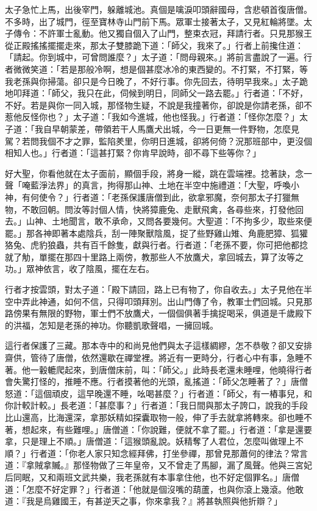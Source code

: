 太子急忙上馬，出後宰門，躲離城池。真個是噙淚叩頭辭國母，含悲頓首復唐僧。不多時，出了城門，徑至寶林寺山門前下馬。眾軍士接著太子，又見紅輪將墜。太子傳令：不許軍士亂動。他又獨自個入了山門，整束衣冠，拜請行者。只見那猴王從正殿搖搖擺擺走來，那太子雙膝跪下道：「師父，我來了。」行者上前攙住道：「請起。你到城中，可曾問誰麼？」太子道：「問母親來。」將前言盡說了一遍。行者微微笑道：「若是那般冷啊，想是個甚麼冰冷的東西變的。不打緊，不打緊，等我老孫與你掃蕩。卻只是今日晚了，不好行事。你先回去，待明早我來。」太子跪地叩拜道：「師父，我只在此，伺候到明日，同師父一路去罷。」行者道：「不好，不好。若是與你一同入城，那怪物生疑，不說是我撞著你，卻說是你請老孫，卻不惹他反怪你也？」太子道：「我如今進城，他也怪我。」行者道：「怪你怎麼？」太子道：「我自早朝蒙差，帶領若干人馬鷹犬出城，今一日更無一件野物，怎麼見駕？若問我個不才之罪，監陷羑里，你明日進城，卻將何倚？況那班部中，更沒個相知人也。」行者道：「這甚打緊？你肯早說時，卻不尋下些等你？」

好大聖，你看他就在太子面前，顯個手段，將身一縱，跳在雲端裡。捻著訣，念一聲「唵藍淨法界」的真言，拘得那山神、土地在半空中施禮道：「大聖，呼喚小神，有何使令？」行者道：「老孫保護唐僧到此，欲拿邪魔，奈何那太子打獵無物，不敢回朝。問汝等討個人情，快將獐鹿兔、走獸飛禽，各尋些來，打發他回去。」山神、土地聞言，敢不承命，又問各要幾何。大聖道：「不拘多少，取些來便罷。」那各神即著本處陰兵，刮一陣聚獸陰風，捉了些野雞山雉、角鹿肥獐、狐獾狢兔、虎豹狼蟲，共有百千餘隻，獻與行者。行者道：「老孫不要，你可把他都捻就了觔，單擺在那四十里路上兩傍，教那些人不放鷹犬，拿回城去，算了汝等之功。」眾神依言，收了陰風，擺在左右。

行者才按雲頭，對太子道：「殿下請回，路上已有物了，你自收去。」太子見他在半空中弄此神通，如何不信，只得叩頭拜別。出山門傳了令，教軍士們回城。只見那路傍果有無限的野物，軍士們不放鷹犬，一個個俱著手擒捉喝采，俱道是千歲殿下的洪福，怎知是老孫的神功。你聽凱歌聲唱，一擁回城。

這行者保護了三藏。那本寺中的和尚見他們與太子這樣綢繆，怎不恭敬？卻又安排齋供，管待了唐僧，依然還歇在禪堂裡。將近有一更時分，行者心中有事，急睡不著。他一轂轆爬起來，到唐僧床前，叫：「師父。」此時長老還未睡哩，他曉得行者會失驚打怪的，推睡不應。行者摸著他的光頭，亂搖道：「師父怎睡著了？」唐僧怒道：「這個頑皮，這早晚還不睡，吆喝甚麼？」行者道：「師父，有一樁事兒，和你計較計較。」長老道：「甚麼事？」行者道：「我日間與那太子誇口，說我的手段比山還高，比海還深，拿那妖精如探囊取物一般，伸了手去就拿將轉來。卻也睡不著，想起來，有些難哩。」唐僧道：「你說難，便就不拿了罷。」行者道：「拿是還要拿，只是理上不順。」唐僧道：「這猴頭亂說。妖精奪了人君位，怎麼叫做理上不順？」行者道：「你老人家只知念經拜佛，打坐參禪，那曾見那蕭何的律法？常言道：『拿賊拿贓。』那怪物做了三年皇帝，又不曾走了馬腳，漏了風聲。他與三宮妃后同眠，又和兩班文武共樂，我老孫就有本事拿住他，也不好定個罪名。」唐僧道：「怎麼不好定罪？」行者道：「他就是個沒嘴的葫蘆，也與你滾上幾滾。他敢道：『我是烏雞國王，有甚逆天之事，你來拿我？』將甚執照與他折辯？」

